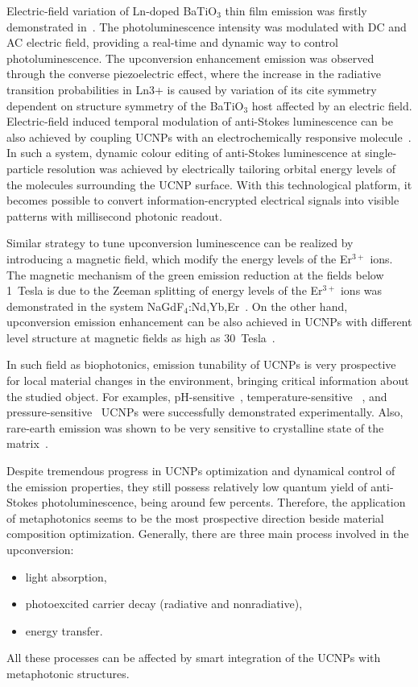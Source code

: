 \documentclass[journal=chreay,manuscript=review]{achemso}
\begin{document}
Electric-field variation of Ln-doped BaTiO$_3$ thin film emission was firstly demonstrated in~\cite{hao2011electric}. The photoluminescence intensity was modulated with DC and AC electric field, providing a real-time and dynamic way to control photoluminescence. The upconversion enhancement emission was observed through the converse piezoelectric effect, where the increase in the radiative transition probabilities in Ln3+ is caused by variation of its cite symmetry dependent on structure symmetry of the BaTiO$_3$ host affected by an electric field.
Electric-field induced temporal modulation of anti-Stokes luminescence can be also achieved by coupling UCNPs with an electrochemically responsive molecule~\cite{wu2021dynamic}. In such a system, dynamic colour editing of anti-Stokes luminescence at single-particle resolution was achieved by electrically tailoring orbital energy levels of the molecules surrounding the UCNP surface. With this technological platform, it becomes possible to convert information-encrypted electrical signals into visible patterns with millisecond photonic readout.

Similar strategy to tune upconversion luminescence can be realized by introducing a magnetic field, which modify the energy levels of the Er$^{3+}$ ions. The magnetic mechanism of the green emission reduction at the fields below 1~Tesla is due to the Zeeman splitting of energy levels of the Er$^{3+}$ ions was demonstrated in the system NaGdF$_4$:Nd,Yb,Er~\cite{liu2013magnetic}. On the other hand, upconversion emission enhancement can be also achieved in UCNPs with different level structure at magnetic fields as high as 30~Tesla~\cite{xiao2016dynamically}.

In such field as biophotonics, emission tunability of UCNPs is very prospective for local material changes in the environment, bringing critical information about the studied object. For examples, pH-sensitive~\cite{tsai2019upconversion}, temperature-sensitive ~\cite{fernandez2018continuous}, and pressure-sensitive~\cite{wisser2015strain} UCNPs were successfully demonstrated experimentally. Also, rare-earth emission was shown to be very sensitive to crystalline state of the matrix~\cite{larin2021luminescent}.

Despite tremendous progress in UCNPs optimization and dynamical control of the emission properties, they still possess relatively low quantum yield of anti-Stokes photoluminescence, being around few percents. Therefore, the application of metaphotonics seems to be the most prospective direction beside material composition optimization.   
Generally, there are three main process involved in the upconversion: 
\begin{itemize}
\item{light absorption}, 
\item{photoexcited carrier decay (radiative and nonradiative)},
\item{energy transfer}. 
\end{itemize}
All these processes can be affected by smart integration of the UCNPs with metaphotonic structures. 
\end{document}
